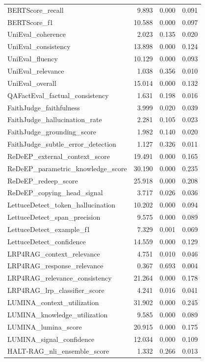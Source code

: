 \begin{table}
\begin{tabular}{lrrr}
BERTScore_recall & 9.893 & 0.000 & 0.091 \\
BERTScore_f1 & 10.588 & 0.000 & 0.097 \\
UniEval_coherence & 2.023 & 0.135 & 0.020 \\
UniEval_consistency & 13.898 & 0.000 & 0.124 \\
UniEval_fluency & 10.129 & 0.000 & 0.093 \\
UniEval_relevance & 1.038 & 0.356 & 0.010 \\
UniEval_overall & 15.014 & 0.000 & 0.132 \\
QAFactEval_factual_consistency & 1.631 & 0.198 & 0.016 \\
FaithJudge_faithfulness & 3.999 & 0.020 & 0.039 \\
FaithJudge_hallucination_rate & 2.281 & 0.105 & 0.023 \\
FaithJudge_grounding_score & 1.982 & 0.140 & 0.020 \\
FaithJudge_subtle_error_detection & 1.127 & 0.326 & 0.011 \\
ReDeEP_external_context_score & 19.491 & 0.000 & 0.165 \\
ReDeEP_parametric_knowledge_score & 30.190 & 0.000 & 0.235 \\
ReDeEP_redeep_score & 25.918 & 0.000 & 0.208 \\
ReDeEP_copying_head_signal & 3.717 & 0.026 & 0.036 \\
LettuceDetect_token_hallucination & 10.202 & 0.000 & 0.094 \\
LettuceDetect_span_precision & 9.575 & 0.000 & 0.089 \\
LettuceDetect_example_f1 & 7.329 & 0.001 & 0.069 \\
LettuceDetect_confidence & 14.559 & 0.000 & 0.129 \\
LRP4RAG_context_relevance & 4.751 & 0.010 & 0.046 \\
LRP4RAG_response_relevance & 0.367 & 0.693 & 0.004 \\
LRP4RAG_relevance_consistency & 21.264 & 0.000 & 0.178 \\
LRP4RAG_lrp_classifier_score & 4.241 & 0.016 & 0.041 \\
LUMINA_context_utilization & 31.902 & 0.000 & 0.245 \\
LUMINA_knowledge_utilization & 9.585 & 0.000 & 0.089 \\
LUMINA_lumina_score & 20.915 & 0.000 & 0.175 \\
LUMINA_signal_confidence & 12.034 & 0.000 & 0.109 \\
HALT-RAG_nli_ensemble_score & 1.332 & 0.266 & 0.013 \\

\end{tabular}
\end{table}
